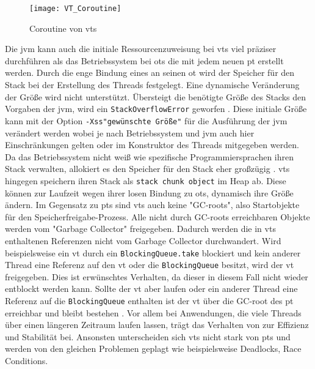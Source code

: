     \begin{figure}[H]
        \centering
        \texttt{[image: VT\_Coroutine]}
        \caption{Coroutine von \Glspl{vt}}
        \label{fig:VT_Coroutine}
    \end{figure}

    Die \gls{jvm} kann auch die initiale Ressourcenzuweisung bei \Glspl{vt} viel präziser durchführen als das Betriebssystem bei \Glspl{ot} die mit jedem neuen \gls{pt}
    erstellt werden. Durch die enge Bindung eines  an seinen \gls{ot} wird der Speicher für den Stack bei der Erstellung des Threads festgelegt.
    Eine dynamische Veränderung der Größe wird nicht unterstützt. Übersteigt die benötigte Größe des Stacks den Vorgaben der \gls{jvm}, wird ein \texttt{StackOverflowError}
    geworfen \cite{jvmSpecification}. Diese initiale Größe kann mit der Option \texttt{-Xss"gewünschte Größe"} für die Ausführung der \gls{jvm} verändert werden wobei 
    je nach Betriebssystem und \gls{jvm} auch hier Einschränkungen gelten oder im Konstruktor des Threads mitgegeben werden. Da das Betriebssystem nicht weiß wie spezifische Programmiersprachen ihren Stack verwalten, allokiert
    es den Speicher für den Stack eher großzügig \cite{ProjectLoom}.
    \Glspl{vt} hingegen speichern ihren Stack als \texttt{stack chunk object} im Heap ab. Diese können zur Laufzeit wegen ihrer losen Bindung zu \Glspl{ot},
    dynamisch ihre Größe ändern. 
    Im Gegensatz zu \Glspl{pt} sind \Glspl{vt} auch keine "GC-roots", also Startobjekte für den Speicherfreigabe-Prozess. Alle nicht durch GC-roots erreichbaren
    Objekte werden vom "Garbage Collector" freigegeben. Dadurch werden die in \Glspl{vt} enthaltenen
    Referenzen nicht vom Garbage Collector durchwandert. Wird beispielsweise ein \gls{vt} durch ein \texttt{BlockingQueue.take} blockiert und kein anderer Thread eine
    Referenz auf den \gls{vt} oder die \texttt{BlockingQueue} besitzt, wird der \gls{vt} freigegeben. Dies ist erwünschtes Verhalten, da dieser in diesem Fall 
    nicht wieder entblockt werden kann. Sollte der \gls{vt} aber laufen oder ein anderer Thread eine Referenz auf die \texttt{BlockingQueue} enthalten ist der 
    \gls{vt} über die GC-root des \gls{pt} erreichbar und bleibt bestehen \cite{JEP444}.
    Vor allem bei Anwendungen, die viele Threads über einen längeren Zeitraum  laufen lassen, trägt das Verhalten von  zur Effizienz und Stabilität bei.
    Ansonsten unterscheiden sich \Glspl{vt} nicht stark von \Glspl{pt} und werden von den gleichen Problemen geplagt wie beispielsweise Deadlocks, Race Conditions\cite{JEP425}.


